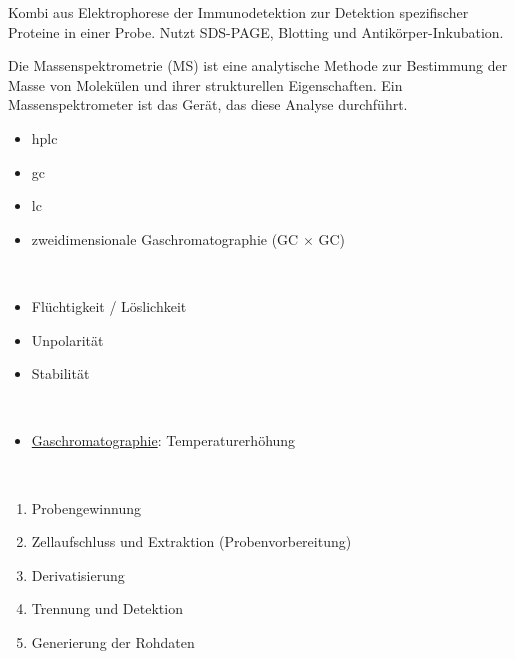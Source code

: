 Kombi aus Elektrophorese der Immunodetektion zur Detektion spezifischer Proteine in einer Probe. Nutzt SDS-PAGE, Blotting und Antikörper-Inkubation.  \\ \newline


Die Massenspektrometrie (MS) ist eine analytische Methode zur Bestimmung der Masse von Molekülen und ihrer strukturellen Eigenschaften. Ein Massenspektrometer ist das Gerät, das diese Analyse durchführt. \\ \newline

\begin{itemize}
    \item \acrlong{hplc}
    \item \acrlong{gc}
    \item \acrlong{lc}
    \item zweidimensionale Gaschromatographie (GC $\times$ GC)
\end{itemize} $\ $ \\
\begin{itemize}
    \item Flüchtigkeit / Löslichkeit 
    \item Unpolarität
    \item Stabilität
\end{itemize}  $\ $ \\
\begin{itemize}
    \item \underline{Gaschromatographie}: Temperaturerhöhung
\end{itemize} $\ $ \\

\begin{enumerate}
    \item Probengewinnung
    \item Zellaufschluss und Extraktion (Probenvorbereitung)
    \item Derivatisierung
    \item Trennung und Detektion
    \item Generierung der Rohdaten
\end{enumerate} $\ $ \\

